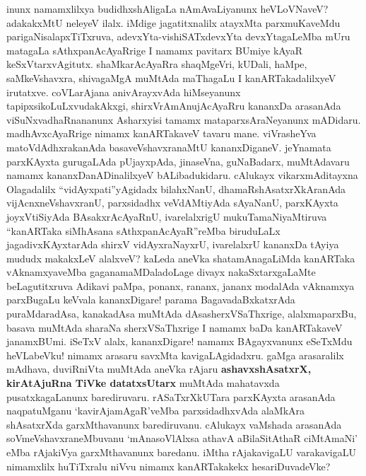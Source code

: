 \documentclass[11pt,a4size]{article}
\begin{document}
inunx namamxlilxya budidhxshAligaLa nAmAvaLiyanunx heVLoVNaveV?
adakakxMtU neleyeV ilalx. iMdige jagatitxnalilx atayxMta parxmuKaveMdu
parigaNisalapxTiTxruva, adevxYta-vishiSATxdevxYta devxYtagaLeMba mUru
matagaLa sAthxpanAcAyaRrige I namamx pavitarx BUmiye kAyaR
keSxVtarxvAgitutx. shaMkarAcAyaRra shaqMgeVri, kUDali, haMpe,
saMkeVshavxra, shivagaMgA muMtAda maThagaLu I kanARTakadalilxyeV
irutatxve. coVLarAjana anivArayxvAda hiMseyanunx
tapipxsikoLuLxvudakAkxgi, shirxVrAmAnujAcAyaRru kananxDa arasanAda
viSuNxvadhaRnananunx Asharxyisi tamamx mataparxsAraNeyanunx
mADidaru. madhAvxcAyaRrige nimamx kanARTakaveV tavaru
mane. viVrasheYva matoVdAdhxrakanAda basaveVshavxranaMtU
kananxDiganeV. jeYnamata parxKAyxta gurugaLAda pUjayxpAda, jinaseVna,
guNaBadarx, muMtAdavaru namamx kananxDanADinalilxyeV
bALibadukidaru. cAlukayx vikarxmAditayxna Olagadalilx
``vidAyxpati''yAgidadx bilahxNanU, dhamaRshAsatxrXkAranAda
vijAcnxneVshavxranU, parxsidadhx veVdAMtiyAda sAyaNanU, parxKAyxta
joyxVtiSiyAda BAsakxrAcAyaRnU, ivarelalxrigU mukuTamaNiyaMtiruva
``kanARTaka siMhAsana sAthxpanAcAyaR''reMba biruduLaLx
jagadivxKAyxtarAda shirxV vidAyxraNayxrU,
 ivarelalxrU kananxDa tAyiya
mududx makakxLeV alalxveV? kaLeda aneVka shatamAnagaLiMda kanARTaka
vAknamxyaveMba gaganamaMDaladoLage divayx nakaSxtarxgaLaMte
beLagutitxruva Adikavi paMpa, ponanx, rananx, jananx modalAda
vAknamxya parxBugaLu keVvala kananxDigare! parama BagavadaBxkatxrAda
puraMdaradAsa, kanakadAsa muMtAda dAsasherxVSaThxrige, alalxmaparxBu,
basava muMtAda sharaNa sherxVSaThxrige I namamx baDa kanARTakaveV
janamxBUmi. iSeTxV alalx, kananxDigare! namamx BAgayxvanunx eSeTxMdu
heVLabeVku! nimamx arasaru savxMta kavigaLAgidadxru. gaMga arasaralilx
mAdhava, duviRniVta muMtAda aneVka rAjaru \textbf{ashavxshAsatxrX,
  kirAtAjuRna TiVke datatxsUtarx} muMtAda mahatavxda pusatxkagaLanunx
barediruvaru. rASaTxrXkUTara parxKAyxta arasanAda naqpatuMganu
`kavirAjamAgaR'veMba parxsidadhxvAda alaMkAra shAsatxrXda
garxMthavanunx barediruvanu. cAlukayx vaMshada arasanAda
soVmeVshavxraneMbuvanu `mAnasoVlAlxsa athavA aBilaSitAthaR ciMtAmaNi'
eMba rAjakiVya garxMthavanunx baredanu. iMtha rAjakavigaLU
varakavigaLU nimamxlilx huTiTxralu niVvu nimamx kanARTakakekx
hesariDuvadeVke?
\end{document}
